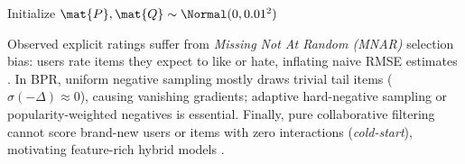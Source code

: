 \documentclass[../../../../master.tex]{subfiles}
\begin{document}
\begin{algorithm}[htbp]
\caption{Stochastic Gradient BPR with Uniform/Popularity Negative Sampling}
\DontPrintSemicolon
{}
Initialize $\mat{P}, \mat{Q} \sim \Normal(0, 0.01^2)$\;
\end{algorithm}

\begin{pitfall}
Observed explicit ratings suffer from \emph{Missing Not At Random (MNAR)} selection bias: users rate items they expect to like or hate, inflating naive RMSE estimates . In BPR, uniform negative sampling mostly draws trivial tail items ($\sigma(-\Delta) \approx 0$), causing vanishing gradients; adaptive hard-negative sampling or popularity-weighted negatives is essential. Finally, pure collaborative filtering cannot score brand-new users or items with zero interactions (\emph{cold-start}), motivating feature-rich hybrid models .
\end{pitfall}
\end{document}
